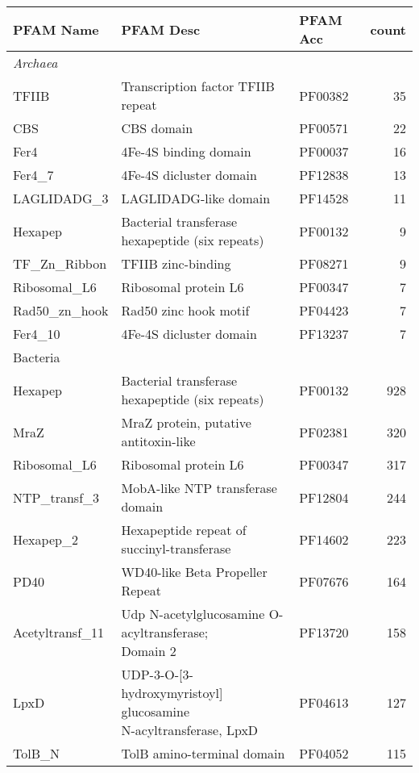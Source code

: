 \documentclass[a4,center,fleqn]{NAR}
\begin{document}
\clearpage
\begin{table*}[t]
\centering

\begin{tabular}{lllr}
  \hline
PFAM Name & PFAM Desc & PFAM Acc & count \\ 
  \hline
\multicolumn{4}{l}{\textit{Archaea}}\\
TFIIB & Transcription factor TFIIB repeat & PF00382 &  35 \\ 
  CBS & CBS domain & PF00571 &  22 \\ 
  Fer4 & 4Fe-4S binding domain & PF00037 &  16 \\ 
  Fer4\_7 & 4Fe-4S dicluster domain & PF12838 &  13 \\ 
  LAGLIDADG\_3 & LAGLIDADG-like domain & PF14528 &  11 \\ 
  Hexapep & Bacterial transferase hexapeptide (six repeats) & PF00132 &   9 \\ 
  TF\_Zn\_Ribbon & TFIIB zinc-binding & PF08271 &   9 \\ 
  Ribosomal\_L6 & Ribosomal protein L6 & PF00347 &   7 \\ 
  Rad50\_zn\_hook & Rad50 zinc hook motif & PF04423 &   7 \\ 
  Fer4\_10 & 4Fe-4S dicluster domain & PF13237 &   7 \\ 
   \hline
\multicolumn{4}{l}{Bacteria}\\
Hexapep & Bacterial transferase hexapeptide (six repeats) & PF00132 & 928 \\ 
  MraZ & MraZ protein, putative antitoxin-like & PF02381 & 320 \\ 
  Ribosomal\_L6 & Ribosomal protein L6 & PF00347 & 317 \\ 
  NTP\_transf\_3 & MobA-like NTP transferase domain & PF12804 & 244 \\ 
  Hexapep\_2 & Hexapeptide repeat of succinyl-transferase & PF14602 & 223 \\ 
  PD40 & WD40-like Beta Propeller Repeat & PF07676 & 164 \\ 
  Acetyltransf\_11 & \makecell[l]{Udp N-acetylglucosamine O-acyltransferase; \\ Domain 2} & PF13720 & 158 \\ 
  LpxD & \makecell[l]{UDP-3-O-[3-hydroxymyristoyl] glucosamine\\ N-acyltransferase, LpxD} & PF04613 & 127 \\ 
  TolB\_N & TolB amino-terminal domain & PF04052 & 115 \\ 

\end{tabular}
\end{table*}
\end{document}
